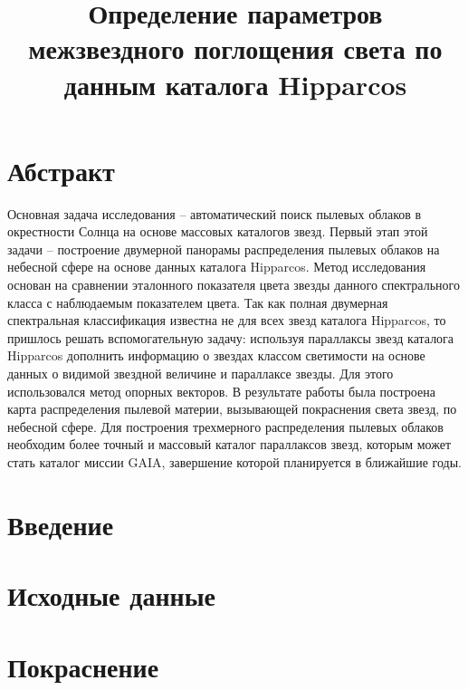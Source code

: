 \documentclass[14pt]{article}
\title{\bf Определение параметров межзвездного поглощения света по данным каталога Hipparcos}
\begin{document}
    \maketitle
    
    \section{Абстракт}
    		Основная задача исследования – автоматический поиск пылевых облаков в окрестности Солнца на основе массовых каталогов звезд. Первый этап этой задачи – построение двумерной панорамы распределения пылевых облаков на небесной сфере на основе данных каталога Hipparcos. Метод исследования основан на сравнении эталонного показателя цвета звезды данного спектрального класса с наблюдаемым показателем цвета. Так как полная двумерная спектральная классификация известна не для всех звезд каталога Hipparcos, то пришлось решать вспомогательную задачу: используя параллаксы звезд каталога Hipparcos дополнить информацию о звездах классом светимости на основе данных о видимой звездной величине и параллаксе звезды. Для этого использовался метод опорных векторов. В результате работы была построена карта распределения пылевой материи, вызывающей покраснения света звезд, по небесной сфере. Для построения трехмерного распределения пылевых облаков необходим более точный и массовый каталог параллаксов звезд, которым может стать каталог миссии GAIA, завершение которой планируется в ближайшие годы.
    		
    	\section{Введение}

    		
    	\section{Исходные данные}
    
    
    \section{Покраснение}
    
\end{document}
